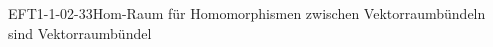 
\begin{EXA}{EFT1-1-02-33}{Hom-Raum für Homomorphismen zwischen Vektorraumbündeln sind Vektorraumbündel}
\end{EXA}
